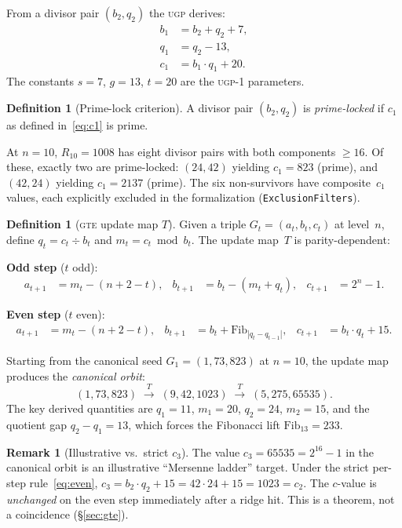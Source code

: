 \documentclass[11pt,a4paper]{article}
\theoremstyle{definition}
\newtheorem{definition}[theorem]{Definition}
\newtheorem{remark}[theorem]{Remark}
\newcommand{\ugp}{\textsc{ugp}}
\newcommand{\gte}{\textsc{gte}}
\newcommand{\Fib}{\ensuremath{\mathrm{Fib}}}
\begin{document}
From a divisor pair $(b_2, q_2)$ the \ugp{} derives:
\begin{align}
  b_1 &= b_2 + q_2 + 7, \label{eq:b1}\\
  q_1 &= q_2 - 13, \label{eq:q1}\\
  c_1 &= b_1 \cdot q_1 + 20. \label{eq:c1}
\end{align}
The constants $s = 7$, $g = 13$, $t = 20$ are the \ugp{}-1 parameters.

\begin{definition}[Prime-lock criterion]\label{def:primelock}
A divisor pair $(b_2, q_2)$ is \emph{prime-locked} if $c_1$ as
defined in~\eqref{eq:c1} is prime.
\end{definition}

At $n = 10$, $R_{10} = 1008$ has eight divisor pairs with both
components $\ge 16$.  Of these, exactly two are prime-locked:
$(24, 42)$ yielding $c_1 = 823$ (prime), and $(42, 24)$ yielding
$c_1 = 2137$ (prime).  The six non-survivors have composite~$c_1$
values, each explicitly excluded in the formalization
(\texttt{ExclusionFilters}).

\begin{definition}[\gte{} update map $T$]\label{def:gte}
Given a triple $G_t = (a_t, b_t, c_t)$ at level~$n$, define
$q_t = c_t \div b_t$ and $m_t = c_t \bmod b_t$.  The update map~$T$
is parity-dependent:

\smallskip\noindent
\textbf{Odd step} ($t$ odd):
\begin{align}
  a_{t+1} &= m_t - (n + 2 - t), &
  b_{t+1} &= b_t - (m_t + q_t), &
  c_{t+1} &= 2^n - 1. \label{eq:odd}
\end{align}

\smallskip\noindent
\textbf{Even step} ($t$ even):
\begin{align}
  a_{t+1} &= m_t - (n + 2 - t), &
  b_{t+1} &= b_t + \Fib_{|q_t - q_{t-1}|}, &
  c_{t+1} &= b_t \cdot q_t + 15. \label{eq:even}
\end{align}
\end{definition}

Starting from the canonical seed $G_1 = (1, 73, 823)$ at $n = 10$, the
update map produces the \emph{canonical orbit}:
\[
  (1, 73, 823) \;\xrightarrow{T}\;
  (9, 42, 1023) \;\xrightarrow{T}\;
  (5, 275, 65535).
\]
The key derived quantities are $q_1 = 11$, $m_1 = 20$, $q_2 = 24$,
$m_2 = 15$, and the quotient gap $q_2 - q_1 = 13$, which forces the
Fibonacci lift $\Fib_{13} = 233$.

\begin{remark}[Illustrative vs.\ strict $c_3$]\label{rem:c3}
The value $c_3 = 65535 = 2^{16} - 1$ in the canonical orbit is an
illustrative ``Mersenne ladder'' target.  Under the strict per-step
rule~\eqref{eq:even}, $c_3 = b_2 \cdot q_2 + 15 = 42 \cdot 24 + 15 =
1023 = c_2$.  The $c$-value is \emph{unchanged} on the even step
immediately after a ridge hit.  This is a theorem, not a coincidence
(\S\ref{sec:gte}).
\end{remark}
\end{document}
